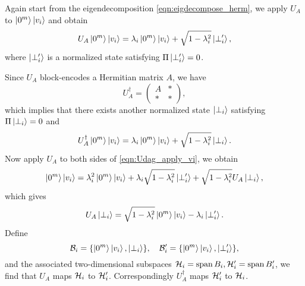 Again start from the eigendecomposition \cref{eqn:eigdecompose_herm}, we apply $U_A$ to $\ket{0^m}\ket{v_i}$ and obtain 
\begin{equation}
U_A\ket{0^m}\ket{v_i}=\lambda_i\ket{0^m}\ket{v_i}+\sqrt{1-\lambda_i^2}\ket{\perp_i'},
\label{eqn:UA_apply_vi_2}
\end{equation}
where $\ket{\perp_i'}$ is a normalized state satisfying $\Pi\ket{\perp_i'}=0$.

Since $U_A$ block-encodes a Hermitian matrix $A$, we have
\begin{equation}
U_A^{\dag}=\begin{pmatrix}
{A} & {*} \\
{*} & {*}
\end{pmatrix},
\end{equation}
which implies that there exists another normalized state $\ket{\perp_i}$ satisfying $\Pi\ket{\perp_i}=0$ and
\begin{equation}
U^{\dag}_A\ket{0^m}\ket{v_i}=\lambda_i\ket{0^m}\ket{v_i}+\sqrt{1-\lambda_i^2}\ket{\perp_i}.
\label{eqn:Udag_apply_vi}
\end{equation}
Now apply $U_A$ to both sides of \cref{eqn:Udag_apply_vi}, we obtain
\begin{equation}
\ket{0^m}\ket{v_i}=\lambda^2_i\ket{0^m}\ket{v_i}+\lambda_i\sqrt{1-\lambda_i^2}\ket{\perp_i'} +\sqrt{1-\lambda_i^2}U_A\ket{\perp_i},
\end{equation}
which gives
\begin{equation}
U_A\ket{\perp_i}=\sqrt{1-\lambda_i^2}\ket{0^m}\ket{v_i}-\lambda_i\ket{\perp_i'}.
\label{eqn:UA_apply_perpi_2}
\end{equation}
Define
\begin{equation}
\mathcal{B}_i=\{\ket{0^m}\ket{v_i},\ket{\perp_i}\}, \quad \mathcal{B}'_i=\{\ket{0^m}\ket{v_i},\ket{\perp_i'}\},
\end{equation}
and the associated two-dimensional subspaces $\mathcal{H}_i=\operatorname{span}{B_i}, \mathcal{H}'_i=\operatorname{span}{B_i'}$, we find that $U_A$ maps $\mathcal{H}_i$ to $\mathcal{H}_i'$.
Correspondingly $U_A^{\dag}$ maps $\mathcal{H}_i'$ to $\mathcal{H}_i$.

